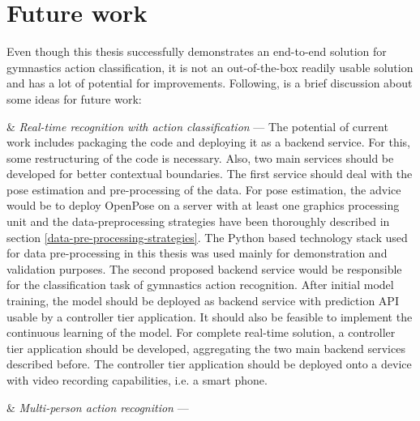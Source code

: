 \section{Future work}

Even though this thesis successfully demonstrates an end-to-end solution for gymnastics action classification, it is not an out-of-the-box readily usable solution and has a lot of potential for improvements. Following, is a brief discussion about some ideas for future work:

\begin{easylist}[enumerate]

& \textit{Real-time recognition with action classification} --- The potential of current work includes packaging the code and deploying it as a backend service. For this, some restructuring of the code is necessary. Also, two main services should be developed for better contextual boundaries. The first service should deal with the pose estimation and pre-processing of the data. For pose estimation, the advice would be to deploy OpenPose on a server with at least one graphics processing unit and the data-preprocessing strategies have been thoroughly described in section \ref{data-pre-processing-strategies}. The Python based technology stack used for data pre-processing in this thesis was used mainly for demonstration and validation purposes. The second proposed backend service would be responsible for the classification task of gymnastics action recognition. After initial model training, the model should be deployed as backend service with prediction API usable by a controller tier application. It should also be feasible to implement the continuous learning of the model. For complete real-time solution, a controller tier application should be developed, aggregating the two main backend services described before. The controller tier application should be deployed onto a device with video recording capabilities, i.e. a smart phone.

& \textit{Multi-person action recognition} ---

    
\end{easylist}



